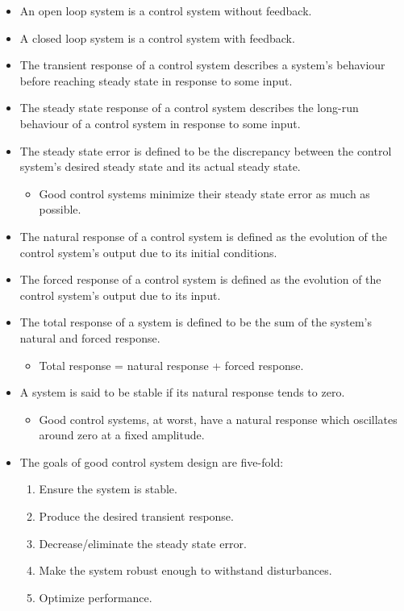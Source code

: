 \documentclass{article}
\begin{document}
\begin{itemize}
	\item An open loop system is a control system without feedback.
	\item A closed loop system is a control system with feedback.
	\item The transient response of a control system describes a system's behaviour before reaching steady state in response to some input.
	\item The steady state response of a control system describes the long-run behaviour of a control system in response to some input.
	\item The steady state error is defined to be the discrepancy between the control system's desired steady state and its actual steady state.
	\begin{itemize}
		\item Good control systems minimize their steady state error as much as possible.
	\end{itemize}
	\item The natural response of a control system is defined as the evolution of the control system's output due to its initial conditions.
	\item The forced response of a control system is defined as the evolution of the control system's output due to its input.
	\item The total response of a system is defined to be the sum of the system's natural and forced response.
	\begin{itemize}
		\item Total response = natural response + forced response.
	\end{itemize}
	\item A system is said to be stable if its natural response tends to zero.
	\begin{itemize}
		\item Good control systems, at worst, have a natural response which oscillates around zero at a fixed amplitude.
	\end{itemize}
	\item The goals of good control system design are five-fold:
	\begin{enumerate}
		\item Ensure the system is stable.
		\item Produce the desired transient response.
		\item Decrease/eliminate the steady state error.
		\item Make the system robust enough to withstand disturbances.
		\item Optimize performance.
	\end{enumerate}
\end{itemize}

\ifdefined\iscombined
	\newpage
\else
	
\end{document}
